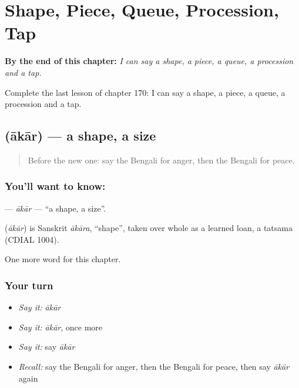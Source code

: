 
\chapter{Shape, Piece, Queue, Procession, Tap}
\label{ch:bn-shape-piece-queue-procession-tap}

\begin{chapteropening}
\textbf{By the end of this chapter:} \emph{I can say a shape, a piece, a queue, a procession and a tap.}

Complete the last lesson of chapter 170: I can say a shape, a piece, a queue, a procession and a tap.
\end{chapteropening}

\section[\texorpdfstring{\bn{আকার} (ākār)}{আকার (ākār)}]{ (ākār) — a shape, a size}

\label{lesson:BN-C170-akar}



\begin{quote}
Before the new one: say the Bengali for anger, then the Bengali for peace.
\end{quote}

\subsection*{You'll want to know: }
\textbf{} — \emph{ākār} — \textquotedblleft{}a shape, a size\textquotedblright{}.

\begin{cousinweb}
\textbf{} (\emph{ākār}) is Sanskrit \emph{ākāra}, \textquotedblleft{}shape\textquotedblright{}, taken over whole as a learned loan, a tatsama (CDIAL 1004).
\end{cousinweb}

\begin{grammarlens}[title={What you've built}]
One more word for this chapter.
\end{grammarlens}

\subsection*{Your turn}
\begin{itemize}
\raggedright
  \item \emph{Say it:} \emph{ākār}
  \item \emph{Say it:} \emph{ākār}, once more
  \item \emph{Say it:} say \emph{ākār}
  \item \emph{Recall:} say the Bengali for anger, then the Bengali for peace, then say \emph{ākār} again
\end{itemize}

